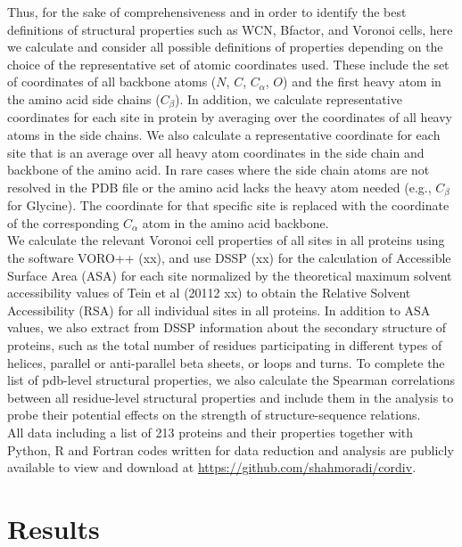 \documentclass[11pt]{article}
\begin{document}
    Thus, for the sake of comprehensiveness and in order to identify the best definitions of structural properties such as WCN, Bfactor, and Voronoi cells, here we calculate and consider all possible definitions of properties depending on the choice of the representative set of atomic coordinates used. These include the set of coordinates of all backbone atoms ($N$, $C$, $C_\alpha$, $O$) and the first heavy atom in the amino acid side chains ($C_\beta$). In addition, we calculate representative coordinates for each site in protein by averaging over the coordinates of all heavy atoms in the side chains. We also calculate a representative coordinate for each site that is an average over all heavy atom coordinates in the side chain and backbone of the amino acid. In rare cases where the side chain atoms are not resolved in the PDB file or the amino acid lacks the heavy atom needed (e.g., $C_\beta$ for Glycine). The coordinate for that specific site is replaced with the coordinate of the corresponding $C_\alpha$ atom in the amino acid backbone.
    \\
    
    We calculate the relevant Voronoi cell properties of all sites in all proteins using the software VORO++ (xx), and use DSSP (xx) for the calculation of Accessible Surface Area (ASA) for each site normalized by the theoretical maximum solvent accessibility values of Tein et al (20112 xx) to obtain the Relative Solvent Accessibility (RSA) for all individual sites in all proteins. In addition to ASA values, we also extract from DSSP information about the secondary structure of proteins, such as the total number of residues participating in different types of helices, parallel or anti-parallel beta sheets, or loops and turns. To complete the list of pdb-level structural properties, we also calculate the Spearman correlations between all residue-level structural properties and include them in the analysis to probe their potential effects on the strength of structure-sequence relations.
    \\
    
    All data including a list of 213 proteins and their properties together with Python, R and Fortran codes written for data reduction and analysis are publicly available to view and download at \url{https://github.com/shahmoradi/cordiv}.


\section{Results}
\label{sec:results}
\end{document}
